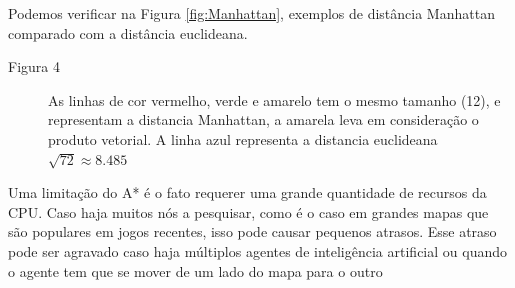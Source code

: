 Podemos verificar na Figura \ref{fig:Manhattan}, exemplos de distância Manhattan comparado com a distância euclideana.

\begin{minipage}{\linewidth}
    \label{fig:Manhattan}
\end{minipage}

\begin{description}
    \item[Figura 4] As linhas de cor vermelho, verde e amarelo tem o mesmo tamanho (12), e representam a distancia Manhattan, a amarela leva em consideração o produto vetorial.
    A linha azul representa a distancia euclideana $\sqrt{72} \approx 8.485$
\end{description}

Uma limitação do A* é o fato requerer uma grande quantidade de recursos da CPU. Caso haja muitos nós a pesquisar, como é o caso em grandes mapas que são populares em jogos recentes, isso  pode causar pequenos atrasos.
Esse atraso pode ser agravado caso haja múltiplos agentes de inteligência artificial ou quando o agente tem que se mover de um lado do mapa para o outro 

